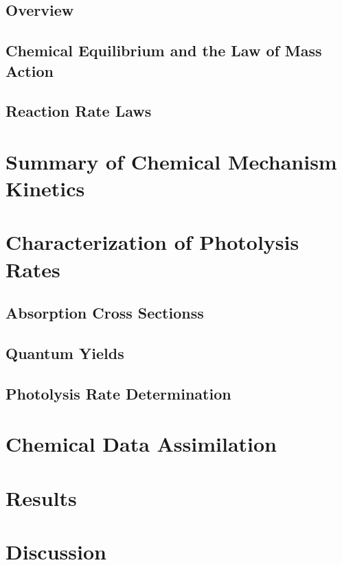 \subsection{Overview}
\subsection{Chemical Equilibrium and the Law of Mass Action}
\subsection{Reaction Rate Laws}

\section{Summary of Chemical Mechanism Kinetics}

\section{Characterization of Photolysis Rates}
\subsection{Absorption Cross Sectionss}
\subsection{Quantum Yields}
\subsection{Photolysis Rate Determination}

\section{Chemical Data Assimilation}

\section{Results}

\section{Discussion}
